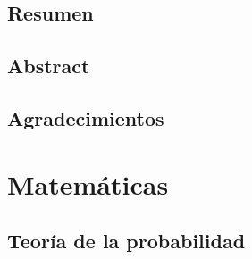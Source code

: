 \documentclass[dottedtoc, headinclude, footinclude=true]{scrreprt}
\begin{document}
\makeatletter
\makeatother



\chapter*{Resumen}
  
\chapter*{Abstract}
  
\chapter*{Agradecimientos}
  

\setcounter{tocdepth}{1}
\tableofcontents

\break 

\setcounter{page}{1}

\makeatletter
\makeatother




\part{Matemáticas}  
  \chapter{Teoría de la probabilidad}
    
\end{document}
